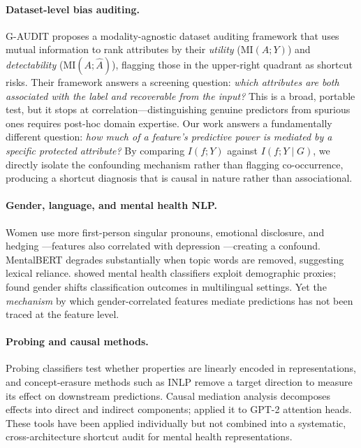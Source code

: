 \documentclass[11pt]{article}
\begin{document}
\paragraph{Dataset-level bias auditing.}
G-AUDIT \citep{drenkow2025gaudit} proposes a modality-agnostic dataset auditing framework that uses mutual information to rank attributes by their \emph{utility} ($\text{MI}(A;Y)$) and \emph{detectability} ($\text{MI}(A;\hat{A})$), flagging those in the upper-right quadrant as shortcut risks. Their framework answers a screening question: \emph{which attributes are both associated with the label and recoverable from the input?} This is a broad, portable test, but it stops at correlation---distinguishing genuine predictors from spurious ones requires post-hoc domain expertise. Our work answers a fundamentally different question: \emph{how much of a feature's predictive power is mediated by a specific protected attribute?} By comparing $I(f;Y)$ against $I(f;Y \mid G)$, we directly isolate the confounding mechanism rather than flagging co-occurrence, producing a shortcut diagnosis that is causal in nature rather than associational.

\paragraph{Gender, language, and mental health NLP.}
Women use more first-person singular pronouns, emotional disclosure, and hedging \citep{newman2008gender,schwartz2013personality}---features also correlated with depression \citep{rude2004language}---creating a confound.
MentalBERT \citep{ji2022mentalbert} degrades substantially when topic words are removed, suggesting lexical reliance.
\citet{harrigian2023characterization} showed mental health classifiers exploit demographic proxies; \citet{schuller2025bias} found gender shifts classification outcomes in multilingual settings.
Yet the \textit{mechanism} by which gender-correlated features mediate predictions has not been traced at the feature level.

\paragraph{Probing and causal methods.}
Probing classifiers \citep{belinkov2022probing} test whether properties are linearly encoded in representations, and concept-erasure methods such as INLP \citep{ravfogel2020null} remove a target direction to measure its effect on downstream predictions.
Causal mediation analysis \citep{imai2010general} decomposes effects into direct and indirect components; \citet{vig2020mediation} applied it to GPT-2 attention heads.
These tools have been applied individually but not combined into a systematic, cross-architecture shortcut audit for mental health representations.
\end{document}
